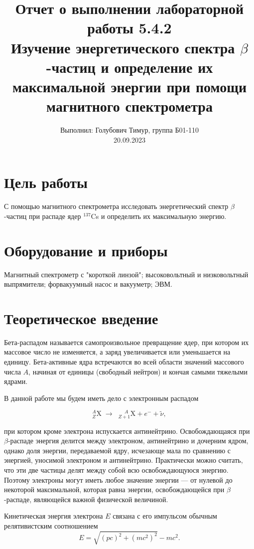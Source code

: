 \documentclass[12pt,a4paper]{article}
\author{\normalsize Выполнил: Голубович Тимур, группа Б01-110 \\
    	\normalsize 20.09.2023}
\date{}
\title{
    	\large Отчет о выполнении лабораторной работы 5.4.2 \\
    	\Large Изучение энергетического спектра $\beta$-частиц и определение их максимальной энергии при помощи магнитного спектрометра
     }
\begin{document}
    	\maketitle

    \section*{Цель работы}

    С помощью магнитного спектрометра исследовать энергетический спектр $\beta$-частиц при распаде ядер $^{137}$Cs и определить их максимальную энергию.

    \section*{Оборудование и приборы}

    Магнитный спектрометр с "короткой линзой"; высоковольтный и низковольтный выпрямители; форвакуумный насос и вакууметр; ЭВМ.
	
    \section*{Теоретическое введение}

    Бета-распадом называется самопроизвольное превращение ядер, при котором их массовое число не изменяется, а заряд увеличивается или уменьшается на единицу. Бета-активные ядра встречаются во всей области значений массового числа $A$, начиная от единицы (свободный нейтрон) и кончая самыми тяжелыми ядрами.	

	В данной работе мы будем иметь дело с электронным распадом

	\begin{equation*}
		_Z^A\text{X} \; \longrightarrow \;\; _{Z+1}^{\;\;\;\;\,A}\text{X} + e^- + \widetilde{\nu},
	\end{equation*}

	\noindent при котором кроме электрона испускается антинейтрино. Освобождающаяся при $\beta$-распаде энергия делится между электроном, антинейтрино и дочерним ядром, однако доля энергии, передаваемой ядру, исчезающе мала по сравнению с энергией, уносимой электроном и антинейтрино. Практически можно считать, что эти две частицы делят между собой всю освобождающуюся энергию. Поэтому электроны могут иметь любое значение энергии — от нулевой до некоторой максимальной, которая равна энергии, освобождающейся при $\beta$-распаде, являющейся важной физической величиной.
	
	Кинетическая энергия электрона $E$ связана с его импульсом обычным релятивистским соотношением
	\begin{equation}
		E = \sqrt{(pc)^2 + (mc^2)^2} - mc^2.
	\end{equation}
\end{document}
